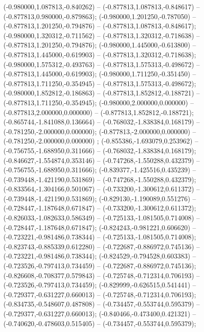  (-0.980000,1.087813,-0.840262) -- (-0.877813,1.087813,-0.848617) -- (-0.877813,0.980000,-0.879863);
 (-0.980000,1.201250,-0.787050) -- (-0.877813,1.201250,-0.794876) -- (-0.877813,1.087813,-0.848617);
 (-0.980000,1.320312,-0.711562) -- (-0.877813,1.320312,-0.718638) -- (-0.877813,1.201250,-0.794876);
 (-0.980000,1.445000,-0.613800) -- (-0.877813,1.445000,-0.619903) -- (-0.877813,1.320312,-0.718638);
 (-0.980000,1.575312,-0.493763) -- (-0.877813,1.575313,-0.498672) -- (-0.877813,1.445000,-0.619903);
 (-0.980000,1.711250,-0.351450) -- (-0.877813,1.711250,-0.354945) -- (-0.877813,1.575313,-0.498672);
 (-0.980000,1.852812,-0.186863) -- (-0.877813,1.852812,-0.188721) -- (-0.877813,1.711250,-0.354945);
 (-0.980000,2.000000,0.000000) -- (-0.877813,2.000000,0.000000) -- (-0.877813,1.852812,-0.188721);
 (-0.865744,-1.841088,0.136664) -- (-0.768032,-1.838384,0.168179) -- (-0.781250,-2.000000,0.000000);
 (-0.877813,-2.000000,0.000000) -- (-0.781250,-2.000000,0.000000) ;
 (-0.855386,-1.693079,0.253962) -- (-0.756755,-1.688950,0.311666) -- (-0.768032,-1.838384,0.168179);
 (-0.846627,-1.554874,0.353146) -- (-0.747268,-1.550288,0.432379) -- (-0.756755,-1.688950,0.311666);
 (-0.839377,-1.425516,0.435239) -- (-0.739448,-1.421190,0.531869) -- (-0.747268,-1.550288,0.432379);
 (-0.833564,-1.304166,0.501067) -- (-0.733200,-1.300612,0.611372) -- (-0.739448,-1.421190,0.531869);
 (-0.829130,-1.190089,0.551276) -- (-0.728447,-1.187648,0.671847) -- (-0.733200,-1.300612,0.611372);
 (-0.826033,-1.082633,0.586349) -- (-0.725133,-1.081505,0.714008) -- (-0.728447,-1.187648,0.671847);
 (-0.824243,-0.981221,0.606620) -- (-0.723221,-0.981486,0.738344) -- (-0.725133,-1.081505,0.714008);
 (-0.823743,-0.885339,0.612280) -- (-0.722687,-0.886972,0.745136) -- (-0.723221,-0.981486,0.738344);
 (-0.824529,-0.794528,0.603383) -- (-0.723526,-0.797413,0.734459) -- (-0.722687,-0.886972,0.745136);
 (-0.826608,-0.708377,0.579843) -- (-0.725748,-0.712314,0.706193) -- (-0.723526,-0.797413,0.734459);
 (-0.829999,-0.626515,0.541441) -- (-0.729377,-0.631227,0.660013) -- (-0.725748,-0.712314,0.706193);
 (-0.834735,-0.548607,0.487808) -- (-0.734457,-0.553744,0.595379) -- (-0.729377,-0.631227,0.660013);
 (-0.840466,-0.473400,0.421321) -- (-0.740620,-0.478603,0.515405) -- (-0.734457,-0.553744,0.595379);
